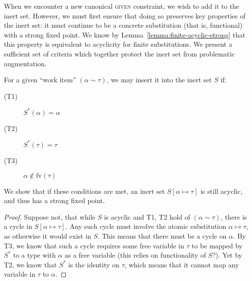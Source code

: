 \documentclass[10pt, letterpaper, oneside]{article}
\newcommand{\fv}{\mathrm{fv}}
\begin{document}
When we encounter a new canonical \textsc{given} constraint, we wish to add it to the inert set. However, we must first ensure that doing so preserves key properties of the inert set: it must continue to be a concrete substitution (that is, functional) with a strong fixed point. We know by Lemma~\ref{lemma:finite-acyclic-strong} that this property is equivalent to acyclicity for finite substitutions. We present a sufficient set of criteria which together protect the inert set from problematic augmentation.






For a given ``work item'' \((\alpha \sim \tau)\), we may insert it into the inert set \(S\) if:

\begin{description}
\item[(T1)] \(S^\ast(\alpha) = \alpha\)
\item[(T2)] \(S^\ast(\tau) = \tau\)
\item[(T3)] \(\alpha \notin \fv(\tau)\)
\end{description}

We show that if these conditions are met, an inert set \(S[\alpha \mapsto \tau]\) is still acyclic, and thus has a strong fixed point.

\begin{proof}
  Suppose not, that while \(S\) is acyclic and T1, T2 hold of \((\alpha \sim \tau)\), there is a cycle in \(S[\alpha \mapsto \tau]\). Any such cycle must involve the atomic substitution \(\alpha \mapsto \tau\), as otherwise it would exist in \(S\). This means that there must be a cycle on \(\alpha\). By T3, we know that such a cycle requires some free variable in \(\tau\) to be mapped by \(S^\ast\) to a type with \(\alpha\) as a free variable (this relies on functionality of \(S\)?). Yet by T2, we know that \(S^\ast\) is the identity on \(\tau\), which means that it cannot map any variable in \(\tau\) to \(\alpha\).
\end{proof}
\end{document}
